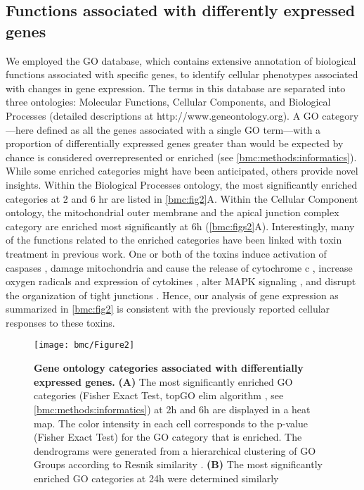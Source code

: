 \subsection{Functions associated with differently expressed genes}

We employed the GO database, which contains extensive 
annotation of biological functions associated with specific 
genes, to identify cellular phenotypes associated with 
changes in gene expression. The terms in this database are 
separated into three ontologies: Molecular Functions, Cellular 
Components, and Biological Processes (detailed descriptions 
at http://www.geneontology.org). A GO category—here defined 
as all the genes associated with a single GO term—with a 
proportion of differentially expressed genes greater than 
would be expected by chance is considered overrepresented 
or enriched (see \ref{bmc:methods:informatics}). While 
some enriched categories might have been anticipated, 
others provide novel insights. Within the Biological 
Processes ontology, the most significantly enriched 
categories at 2 and 6 hr are listed in \autoref{bmc:fig2}A. 
Within the Cellular Component ontology, the mitochondrial 
outer membrane and the apical junction complex category 
are enriched most significantly at 6h (\autoref{bmc:figs2}A). 
Interestingly, many of the functions related to the 
enriched categories have been linked with toxin treatment 
in previous work. One or both of the toxins induce 
activation of caspases 
\cite{Gerhard:2008wz, QaaposDan:2002uj, Carneiro:2006cw, Brito:2002ky}, 
damage mitochondria and cause the release of cytochrome c 
\cite{Matarrese:2007ix, He:2000uc}, increase oxygen radicals 
and expression of cytokines \cite{He:2002cl,Qiu:1999us,Flegel:1991ws}, 
alter MAPK signaling \cite{Meyer:2007kj,Lee:2007gj,Na:2005bx}, 
and disrupt the organization of tight junctions \cite{Nusrat:2001cs}. 
Hence, our analysis of gene expression as summarized in 
\autoref{bmc:fig2} is consistent with the previously reported 
cellular responses to these toxins.

\begin{figure}[h!]
  \centering
  \texttt{[image: bmc/Figure2]}
  \caption[Gene ontology categories associated with differentially expressed genes]{
  \textbf{Gene ontology categories associated with differentially expressed genes.}
  \textbf{(A)} The most significantly enriched GO categories 
  (Fisher Exact Test, topGO elim algorithm \cite{Alexa:2006hg}, 
  see \ref{bmc:methods:informatics}) at 2h and 6h are displayed 
  in a heat map. The color intensity in each cell corresponds to 
  the p-value (Fisher Exact Test) for the GO category that is 
  enriched. The dendrograms were generated from a hierarchical 
  clustering of GO Groups according to Resnik similarity \cite{Resnik:1999jl}.
  \textbf{(B)} The most significantly enriched GO 
  categories at 24h were determined similarly
}
  \label{bmc:fig2}
\end{figure}


